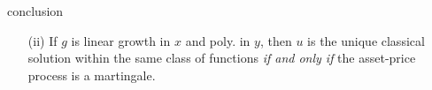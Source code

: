 \documentclass[final]{beamer}
\newlength{\onecolwid}
\theoremstyle{definition}
\theoremstyle{remark}
\begin{document}
\begin{frame}[t]
\begin{columns}[t]
\begin{column}{\onecolwid}
\begin{block}{conclusion}
{\begin{enumerate}
            \item[(ii)] If $g$ is linear growth in $x$ and poly. in $y$, then $u$ is the unique classical solution within the same class of functions \emph{if and only if} the  asset-price process is a martingale.
            \end{enumerate}
        }
        \end{block}

    \end{column}

 \end{columns}
\end{frame}
\end{document}
